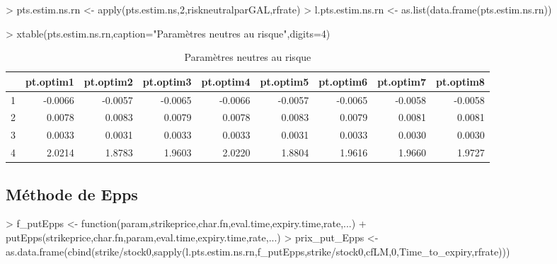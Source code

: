 \documentclass[letter]{report}
\begin{document}
\begin{Schunk}
\begin{Sinput}
> pts.estim.ns.rn <- apply(pts.estim.ns,2,riskneutralparGAL,rfrate)
> l.pts.estim.ns.rn <- as.list(data.frame(pts.estim.ns.rn))
\end{Sinput}
\end{Schunk}

\begin{Schunk}
\begin{Sinput}
> xtable(pts.estim.ns.rn,caption="Paramètres neutres au risque",digits=4)
\end{Sinput}
% latex table generated in R 3.0.2 by xtable 1.7-4 package
% Mon Oct 13 12:28:07 2014
\begin{table}[ht]
\centering
\begin{tabular}{rrrrrrrrr}
  \hline
 & pt.optim1 & pt.optim2 & pt.optim3 & pt.optim4 & pt.optim5 & pt.optim6 & pt.optim7 & pt.optim8 \\ 
  \hline
1 & -0.0066 & -0.0057 & -0.0065 & -0.0066 & -0.0057 & -0.0065 & -0.0058 & -0.0058 \\ 
  2 & 0.0078 & 0.0083 & 0.0079 & 0.0078 & 0.0083 & 0.0079 & 0.0081 & 0.0081 \\ 
  3 & 0.0033 & 0.0031 & 0.0033 & 0.0033 & 0.0031 & 0.0033 & 0.0030 & 0.0030 \\ 
  4 & 2.0214 & 1.8783 & 1.9603 & 2.0220 & 1.8804 & 1.9616 & 1.9660 & 1.9727 \\ 
   \hline
\end{tabular}
\caption{Paramètres neutres au risque} 
\end{table}\end{Schunk}


\subsection{Méthode de Epps}

\begin{Schunk}
\begin{Sinput}
> 	f_putEpps <- function(param,strikeprice,char.fn,eval.time,expiry.time,rate,...)
+ 		putEpps(strikeprice,char.fn,param,eval.time,expiry.time,rate,...)
> 	prix_put_Epps <- as.data.frame(cbind(strike/stock0,sapply(l.pts.estim.ns.rn,f_putEpps,strike/stock0,cfLM,0,Time_to_expiry,rfrate)))
\end{Sinput}
\end{Schunk}
\end{document}
